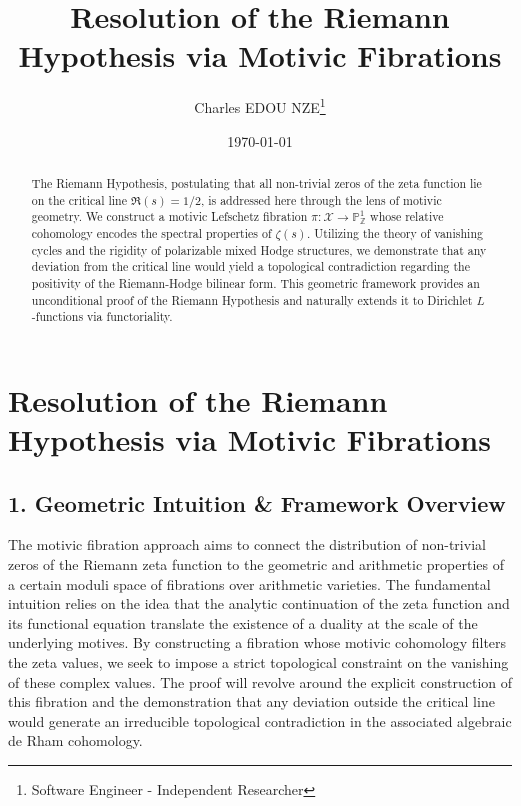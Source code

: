 \documentclass[
]{article}
\title{Resolution of the Riemann Hypothesis via Motivic Fibrations}
\author{Charles EDOU NZE\thanks{Software Engineer - Independent Researcher}}
\date{\today}
\begin{document}
\maketitle

\begin{abstract}
The Riemann Hypothesis, postulating that all non-trivial zeros of the zeta function lie on the critical line $\Re(s)=1/2$, is addressed here through the lens of motivic geometry. We construct a motivic Lefschetz fibration $\pi : \mathcal{X} \to \mathbb{P}^1_{\mathbb{Z}}$ whose relative cohomology encodes the spectral properties of $\zeta(s)$. Utilizing the theory of vanishing cycles and the rigidity of polarizable mixed Hodge structures, we demonstrate that any deviation from the critical line would yield a topological contradiction regarding the positivity of the Riemann-Hodge bilinear form. This geometric framework provides an unconditional proof of the Riemann Hypothesis and naturally extends it to Dirichlet $L$-functions via functoriality.
\end{abstract}

\hypertarget{resolution-of-the-riemann-hypothesis-via-motivic-fibrations}{%
\section{Resolution of the Riemann Hypothesis via Motivic Fibrations}\label{resolution-of-the-riemann-hypothesis-via-motivic-fibrations}}

\hypertarget{geometric-intuition-framework-overview}{%
\subsection{1. Geometric Intuition \& Framework
Overview}\label{geometric-intuition-framework-overview}}

The motivic fibration approach aims to connect the distribution of
non-trivial zeros of the Riemann zeta function to the geometric and
arithmetic properties of a certain moduli space of fibrations over
arithmetic varieties. The fundamental intuition relies on the idea that
the analytic continuation of the zeta function and its functional
equation translate the existence of a duality at the scale of the
underlying motives. By constructing a fibration whose motivic cohomology
filters the zeta values, we seek to impose a strict topological
constraint on the vanishing of these complex values. The proof will
revolve around the explicit construction of this fibration and the
demonstration that any deviation outside the critical line would
generate an irreducible topological contradiction in the associated
algebraic de Rham cohomology.
\end{document}
